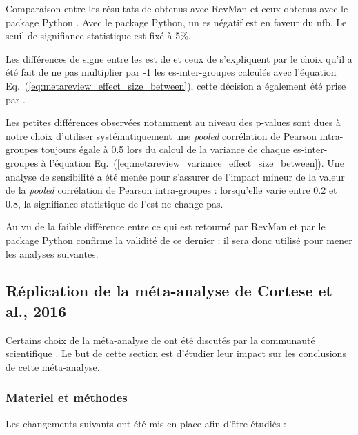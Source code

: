 \begin{table}[h!]
  \centering
  \caption{Comparaison entre les résultats de \citet{Cortese2016} obtenus avec RevMan \citep{Revman} et ceux obtenus avec le package Python \citep{Bussalb2019clinical}.
	Avec le package Python, un \gls{es} négatif est en faveur du \gls{nfb}. Le seuil de signifiance statistique est fixé à 5\%.}
  
  \label{Table:table_meta_review_comparison_revman_python}
\end{table}

Les différences de signe entre les \gls{est} de \citet{Cortese2016} et ceux de \citet{Bussalb2019clinical} s'expliquent par le choix qu'il a été fait de ne pas multiplier
par -1 les \gls{es}-inter-groupes calculés avec l'équation Eq.~(\ref{eq:metareview_effect_size_between}), cette décision a également été prise par 
\citet{Micoulaud2014}.

Les petites différences observées notamment au niveau des p-values sont dues à notre choix d'utiliser systématiquement une \textit{pooled} corrélation de Pearson 
intra-groupes toujours égale à 0.5 \citep{Balk2012} lors du calcul de la variance de chaque \gls{es}-inter-groupes à l'équation 
Eq.~(\ref{eq:metareview_variance_effect_size_between}). Une analyse de sensibilité a été menée pour s'assurer de l'impact mineur de la valeur de la \textit{pooled} 
corrélation de Pearson intra-groupes : lorsqu'elle varie entre 0.2 et 0.8, la signifiance statistique de l'\gls{est} ne change pas.

Au vu de la faible différence entre ce qui est retourné par RevMan et par le package Python confirme la validité de ce dernier : il sera donc utilisé pour mener
les analyses suivantes.

\subsection{Réplication de la méta-analyse de Cortese et al., 2016} \label{replication}

Certains choix de la méta-analyse de \citet{Cortese2016} ont été discutés par la communauté scientifique \citep{Micoulaud2016}. Le but de cette section est 
d'étudier leur impact sur les conclusions de cette méta-analyse.

\subsubsection{Materiel et méthodes}
Les changements suivants ont été mis en place afin d'être étudiés :

